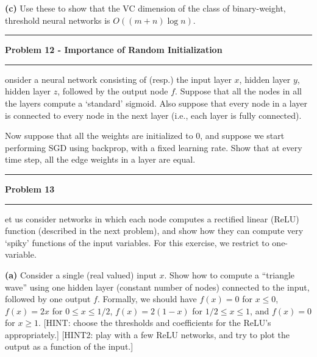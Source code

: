 \documentclass[11pt]{article}
\newcommand\question[2]{\vspace{.25in}\hrule\textbf{#1}\vspace{.5em}\hrule\vspace{.10in}}
\renewcommand\part[1]{\vspace{.10in}\textbf{(#1)}}
\begin{document}
\part{c} Use these to show that the VC dimension of the class of binary-weight, threshold neural networks is $O((m+n)\log ⁡n)$.


\question{Problem 12 - Importance of Random Initialization}

Consider a neural network consisting of (resp.) the input layer $x$, hidden layer $y$, hidden layer $z$, followed by the output node $f$. Suppose that all the nodes in all the layers compute a `standard' sigmoid. Also suppose that every node in a layer is connected to every node in the next layer (i.e., each layer is fully connected).

Now suppose that all the weights are initialized to 0, and suppose we start performing SGD using backprop, with a fixed learning rate. Show that at every time step, all the edge weights in a layer are equal.


\question{Problem 13}

Let us consider networks in which each node computes a rectified linear (ReLU) function (described in the next problem), and show how they can compute very `spiky' functions of the input variables. For this exercise, we restrict to one-variable.

\part{a} Consider a single (real valued) input $x$. Show how to compute a ``triangle wave'' using one hidden layer (constant number of nodes) connected to the input, followed by one output $f$. Formally, we should have $f(x) = 0$ for $x \leq 0$, $f(x) = 2x$ for $0 \leq x \leq 1/2$, $f(x) = 2(1 - x)$ for $1/2 \leq x \leq 1$, and $f(x) = 0$ for $x \geq 1$. [HINT: choose the thresholds and coefficients for the ReLU's appropriately.] [HINT2: play with a few ReLU networks, and try to plot the output as a function of the input.]
\end{document}
